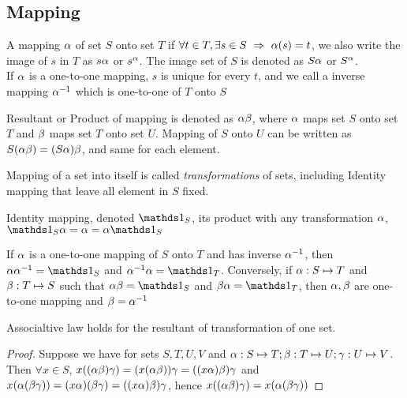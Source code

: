 	\subsection{Mapping}
		\begin{definition}
		A mapping $\alpha$ of set $S$ onto set $T$ if $\forall t\in T, \exists s\in S \hbox{$\textrm{ }\Rightarrow\textrm{ }$} \alpha(s)=t$, we also write the image of $s$ in $T$ as $s\alpha$ or $s^\alpha$. The image set of $S$ is denoted as $S\alpha$ or $S^\alpha$.\\
		If $\alpha$ is a one-to-one mapping, $s$ is unique for every $t$, and we call a inverse mapping $\alpha^{-1}$ which is one-to-one of $T$ onto $S$
		\end{definition}
		\begin{definition}
		Resultant or Product of mapping is denoted as $\alpha\beta$, where $\alpha$ maps set $S$ onto set $T$ and $\beta$ maps set $T$ onto set $U$. Mapping of $S$ onto $U$ can be written as $S(\alpha\beta)=(S\alpha)\beta$, and same for each element.
		\end{definition}
		\begin{remark}
		Mapping of a set into itself is called \textit{transformations} of sets, including Identity mapping that leave all element in $S$ fixed.
		\end{remark}
		\begin{definition}
		Identity mapping, denoted $\id_S$, its product with any transformation $\alpha$, $\id_S\a = \a = \a\id_S$
		\end{definition}
		\begin{theorem}
		If $\alpha$ is a one-to-one mapping of $S$ onto $T$ and has inverse $\alpha^{-1}$, then $\a\a^{-1}=\id_S$ and $\a^{-1}\a=\id_T$. Conversely, if $\alpha:S\mapsto T$ and $\beta:T \mapsto S$ such that $\a\b=\id_S$ and $\b\a=\id_T$, then $\alpha,\beta$ are one-to-one mapping and $\beta = \alpha^{-1}$
		\end{theorem}
		\begin{theorem}
		Associaltive law holds for the resultant of transformation of one set.
		\end{theorem}
		\begin{proof}
		Suppose we have for sets $S,T,U,V$ and $\alpha:S\mapsto T;\beta:T\mapsto U;\gamma:U\mapsto V$. Then $\forall x\in S$, $x((\alpha\beta)\gamma)=(x(\alpha\beta))\gamma=((x\alpha)\beta)\gamma$ and $x(\alpha(\beta\gamma))=(x\alpha)(\beta\gamma)=((x\alpha)\beta)\gamma$, hence $x((\alpha\beta)\gamma)=x(\alpha(\beta\gamma))$
		\end{proof}
